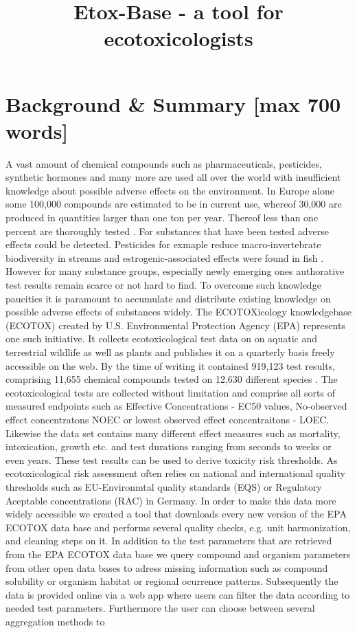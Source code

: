 \documentclass[english]{article}
\newcommand{\epa}{EPA ECOTOX data base}
\begin{document}
\title{Etox-Base - a tool for ecotoxicologists}


\begin{abstract}

\end{abstract}


\section*{Background \& Summary [max 700 words]}

A vast amount of chemical compounds such as pharmaceuticals, pesticides, synthetic hormones and many more are used all over the world with insufficient knowledge about possible adverse effects on the environment. In Europe alone some 100,000 compounds are estimated to be in current use, whereof 30,000 are produced in quantities larger than one ton per year. Thereof less than one percent are thoroughly tested \citep{breithaupt_costs_2006}. For substances that have been tested adverse effects could be detected. Pesticides for exmaple reduce macro-invertebrate biodiversity in streams \citep{beketov_pesticides_2013} and estrogenic-associated effects were found in fish \citep{vethaak_integrated_2005}. However for many substance groups, especially newly emerging ones authorative test results remain scarce or not hard to find. To overcome such knowledge paucities it is paramount to accumulate and distribute existing knowledge on possible adverse effects of substances widely. The ECOTOXicology knowledgebase (ECOTOX) created by U.S. Environmental Protection Agency (EPA) represents one such initiative. It collects ecotoxicological test data on on aquatic and terrestrial wildlife as well as plants and publishes it on a quarterly basis freely accessible on the web. By the time of writing it contained 919,123 test results, comprising 11,655 chemical compounds tested on 12,630 different species \citep{elonen_ecotoxicology_2018}. The ecotoxicological tests are collected without limitation and comprise all sorts of measured endpoints such as Effective Concentrations - EC50 values, No-observed effect concentratons NOEC or lowest observed effect concentraitons - LOEC. Likewise the data set contains many different effect measures such as mortality, intoxication, growth etc. and test durations ranging from seconds to weeks or even years. These test results can be used to derive toxicity risk thresholds. As ecotoxicological risk assessment often relies on national and international quality thresholds such as EU-Environmtal quality standards (EQS) or Regulatory Aceptable concentrations (RAC) in Germany. In order to make this data more widely accessible we created a tool that downloads every new version of the \epa{} and performs several quality checks, e.g. unit harmonization, and cleaning steps on it. In addition to the test parameters that are retrieved from the \epa{} we query compound and organism parameters from other open data bases to adress missing information such as compound solubility or organism habitat or regional ocurrence patterns. Subsequently the data is provided online via a web app where users can filter the data according to needed test parameters. Furthermore the user can choose between several aggregation methods to 
\end{document}
